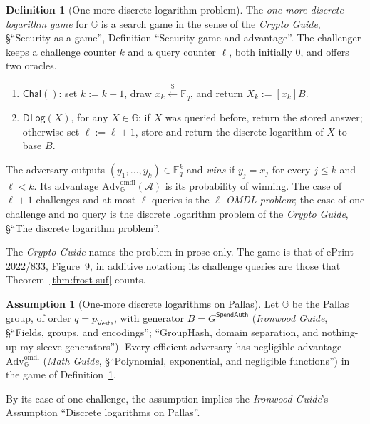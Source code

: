 \documentclass[11pt,a4paper]{article}
\theoremstyle{definition}
\newtheorem{definition}[theorem]{Definition}
\newtheorem{assumption}[theorem]{Assumption}
\newcommand{\F}{\mathbb{F}}
\newcommand{\G}{\mathbb{G}}
\newcommand{\Fq}{\F_q}
\newcommand{\Adv}{\mathcal{A}}
\newcommand{\Vesta}{\ensuremath{\mathsf{Vesta}}}
\begin{document}
\begin{definition}[One-more discrete logarithm problem]\label{def:omdl}
The \emph{one-more discrete logarithm game} for \(\G\) is a search game in
the sense of the \emph{Crypto Guide}, \S``Security as a game'', Definition
``Security game and advantage''. The challenger keeps a challenge counter
\(k\) and a query counter \(\ell\), both initially \(0\), and offers two
oracles.
\begin{enumerate}
\item[] \(\mathsf{Chal}()\): set \(k := k + 1\), draw
  \(x_k \xleftarrow{\$} \Fq\), and return \(X_k := [x_k]B\).
\item[] \(\mathsf{DLog}(X)\), for any \(X \in \G\): if \(X\) was queried
  before, return the stored answer; otherwise set \(\ell := \ell + 1\),
  store and return the discrete logarithm of \(X\) to base \(B\).
\end{enumerate}
The adversary outputs \((y_1, \dots, y_k) \in \Fq^k\) and \emph{wins} if
\(y_j = x_j\) for every \(j \le k\) and \(\ell < k\). Its advantage
\(\mathrm{Adv}^{\mathrm{omdl}}_{\G}(\Adv)\) is its probability of winning.
The case of \(\ell + 1\) challenges and at most \(\ell\) queries is the
\emph{\(\ell\)-OMDL problem}; the case of one challenge and no query is the
discrete logarithm problem of the \emph{Crypto Guide}, \S``The discrete
logarithm problem''.
\end{definition}

The \emph{Crypto Guide} names the problem in prose only. The game is that of
ePrint 2022/833, Figure~9, in additive notation; its challenge queries are
those that Theorem~\ref{thm:frost-suf} counts.

\begin{assumption}[One-more discrete logarithms on Pallas]
\label{ass:omdl-pallas}
Let \(\G\) be the Pallas group, of order \(q = p_{\Vesta}\), with generator
\(B = G^{\mathsf{SpendAuth}}\) (\emph{Ironwood Guide}, \S``Fields, groups, and
encodings''; ``GroupHash, domain separation, and nothing-up-my-sleeve
generators''). Every efficient adversary has negligible advantage
\(\mathrm{Adv}^{\mathrm{omdl}}_{\G}\) (\emph{Math Guide}, \S``Polynomial,
exponential, and negligible functions'') in the game of
Definition~\ref{def:omdl}.
\end{assumption}

By its case of one challenge, the assumption implies the \emph{Ironwood
Guide}'s Assumption ``Discrete logarithms on Pallas''.
\end{document}

